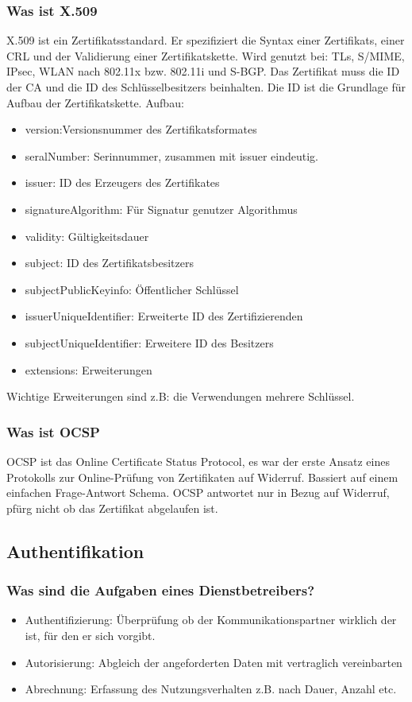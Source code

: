 	\subsubsection{Was ist X.509}
	X.509 ist ein Zertifikatsstandard. Er spezifiziert die Syntax einer Zertifikats, einer CRL und der Validierung einer Zertifikatskette. Wird genutzt bei: TLs, S/MIME, IPsec, WLAN nach 802.11x bzw. 802.11i und S-BGP.
	\newline
	Das Zertifikat muss die ID der CA und die ID des Schlüsselbesitzers beinhalten. Die ID ist die Grundlage für Aufbau der Zertifikatskette.\newline
	Aufbau: 
	\begin{itemize}
		\item version:Versionsnummer des Zertifikatsformates
		\item seralNumber: Serinnummer, zusammen mit issuer eindeutig.
		\item issuer: ID des Erzeugers des Zertifikates
		\item signatureAlgorithm: Für Signatur genutzer Algorithmus
		\item validity: Gültigkeitsdauer
		\item subject: ID des Zertifikatsbesitzers
		\item subjectPublicKeyinfo: Öffentlicher Schlüssel
		\item issuerUniqueIdentifier: Erweiterte ID des Zertifizierenden
		\item subjectUniqueIdentifier: Erweitere ID des Besitzers
		\item extensions: Erweiterungen		
	\end{itemize}
	Wichtige Erweiterungen sind z.B: die Verwendungen mehrere Schlüssel. 
	
	\subsubsection{Was ist OCSP}
	OCSP ist das Online Certificate Status Protocol, es war der erste Ansatz eines Protokolls zur Online-Prüfung von Zertifikaten auf Widerruf. Bassiert auf einem einfachen Frage-Antwort Schema.  OCSP antwortet nur in Bezug auf Widerruf, pfürg nicht ob das Zertifikat abgelaufen ist.
	
	\subsection{Authentifikation}
	\subsubsection{Was sind die Aufgaben eines Dienstbetreibers?}
	\begin{itemize}
		\item Authentifizierung: Überprüfung ob der Kommunikationspartner wirklich der ist, für den er sich vorgibt.
		\item Autorisierung: Abgleich der angeforderten Daten mit vertraglich vereinbarten
		\item Abrechnung: Erfassung des Nutzungsverhalten z.B. nach Dauer, Anzahl etc.
	\end{itemize}
	
